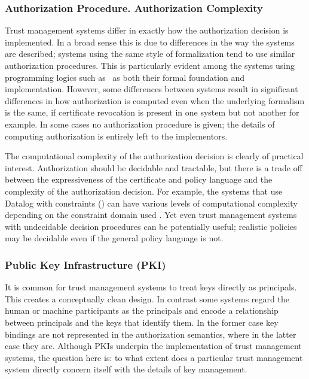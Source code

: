 \subsubsection{Authorization Procedure. Authorization Complexity} Trust
management systems differ in exactly how the authorization decision is
implemented. In a broad sense this is due to differences in the way
the systems are described; systems using the same style of
formalization tend to use similar authorization procedures. This is
particularly evident among the systems using programming logics such
as \datalog\ as both their formal foundation and implementation.
However, some differences between systems result in significant
differences in how authorization is computed even when the underlying
formalism is the same, if certificate revocation is present in one
system but not another for example.  In some cases no authorization
procedure is given; the details of computing authorization is entirely
left to the implementors.

The computational complexity of the authorization decision is clearly of
practical interest. Authorization should be decidable
and tractable, but there is a trade off between the expressiveness of the
certificate and policy language and the complexity of the authorization
decision. For example, the systems that use Datalog with constraints
(\datalogc) can have various levels of computational complexity depending
on the constraint domain used \cite{Li:DCFTML}. Yet even trust management
systems with undecidable decision procedures can be potentially useful;
realistic policies may be decidable even if the general policy language is
not.


\subsubsection{Public Key Infrastructure (PKI)} It is common for trust
management systems to treat keys directly as principals. This creates a
conceptually clean design. In contrast some systems regard the human or
machine participants as the principals and encode a relationship between
principals and the keys that identify them. In the former case key bindings
are not represented in the authorization semantics, where in the latter
case they are. Although PKIs underpin the implementation of trust
management systems, the question here is: to what extent does a particular
trust management system directly concern itself with the details of key
management.

